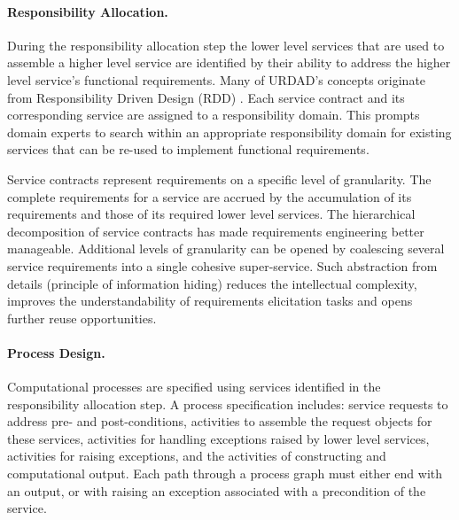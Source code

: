 \paragraph{Responsibility Allocation.} During the responsibility allocation step the lower level services that are used to assemble a higher level service are identified by their ability to address the higher level service's functional requirements. Many of URDAD's concepts originate from Responsibility Driven Design (RDD) \cite{wirfs-brock_object-oriented_1989,wirfs-brock_object_2002}. Each service contract and its corresponding service are assigned to a responsibility domain. This prompts domain experts to search within an appropriate responsibility domain for existing services that can be re-used to implement functional requirements.

Service contracts represent requirements on a specific level of granularity. The complete requirements for a service are accrued by the accumulation of its requirements and those of its required lower level services. The hierarchical decomposition of service contracts has made requirements engineering better manageable. Additional levels of granularity can be opened by coalescing several service requirements into a single cohesive super-service. Such abstraction from details (principle of information hiding) reduces the intellectual complexity, improves the understandability of requirements elicitation tasks and opens further reuse opportunities.

\paragraph{Process Design.} Computational processes are specified using services identified in the responsibility allocation step. A process specification includes: service requests to address pre- and post-conditions, activities to assemble the request objects for these services, activities for handling exceptions raised by lower level services, activities for raising exceptions, and the activities of constructing and computational output. Each path through a process graph must either end with an output, or with raising an exception associated with a precondition of the service.

